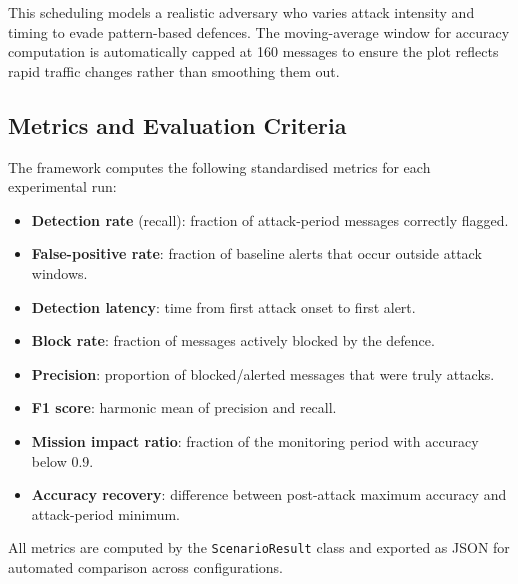 This scheduling models a realistic adversary who varies attack intensity and timing to evade pattern-based defences.
The moving-average window for accuracy computation is automatically capped at 160 messages to ensure the plot reflects rapid traffic changes rather than smoothing them out.

\subsection{Metrics and Evaluation Criteria}

The framework computes the following standardised metrics for each experimental run:

\begin{itemize}
    \item \textbf{Detection rate} (recall): fraction of attack-period messages correctly flagged.
    \item \textbf{False-positive rate}: fraction of baseline alerts that occur outside attack windows.
    \item \textbf{Detection latency}: time from first attack onset to first alert.
    \item \textbf{Block rate}: fraction of messages actively blocked by the defence.
    \item \textbf{Precision}: proportion of blocked/alerted messages that were truly attacks.
    \item \textbf{F1 score}: harmonic mean of precision and recall.
    \item \textbf{Mission impact ratio}: fraction of the monitoring period with accuracy below 0.9.
    \item \textbf{Accuracy recovery}: difference between post-attack maximum accuracy and attack-period minimum.
\end{itemize}

All metrics are computed by the \texttt{ScenarioResult} class and exported as JSON for automated comparison across configurations.

